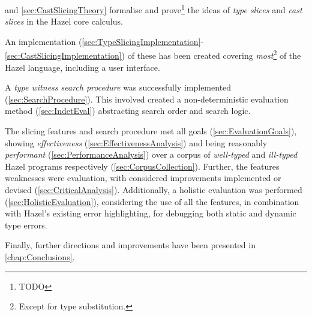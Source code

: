 and \cref{sec:CastSlicingTheory} formalise and prove\footnote{TODO} the ideas of \textit{type slices} and \textit{cast slices} in the Hazel core calculus. 
 
 An implementation (\cref{sec:TypeSlicingImplementation}-\ref{sec:CastSlicingImplementation}) of these has been created covering \textit{most}\footnote{Except for type substitution.} of the Hazel language, including a user interface. 
 
 A \textit{type witness search procedure} was successfully implemented (\cref{sec:SearchProcedure}). This involved created a non-deterministic evaluation method (\cref{sec:IndetEval}) abstracting search order and search logic.

The slicing features and search procedure met all goals (\cref{sec:EvaluationGoals}), showing \textit{effectiveness} (\cref{sec:EffectivenessAnalysis}) and being reasonably \textit{performant} (\cref{sec:PerformanceAnalysis}) over a corpus of \textit{well-typed} and \textit{ill-typed} Hazel programs respectively (\cref{sec:CorpusCollection}). Further, the features weaknesses were evaluation, with considered improvements implemented or devised (\cref{sec:CriticalAnalysis}). Additionally, a holistic evaluation was performed (\cref{sec:HolisticEvaluation}), considering the use of all the features, in combination with Hazel's existing error highlighting, for debugging both static and dynamic type errors.

Finally, further directions and improvements have been presented in \cref{chap:Conclusions}.